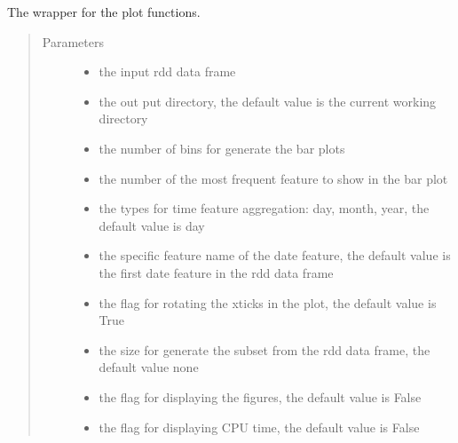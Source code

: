 \documentclass[letterpaper,12pt,english]{sphinxmanual}
\begin{document}
\begin{fulllineitems}
The wrapper for the plot functions.
\begin{quote}\begin{description}
\item[{Parameters}] \leavevmode\begin{itemize}
\item {} 
 \textendash{} the input rdd data frame

\item {} 
 \textendash{} the out put directory, the default value is the current working directory

\item {} 
 \textendash{} the number of bins for generate the bar plots

\item {} 
 \textendash{} the number of the most frequent feature to show in the bar plot

\item {} 
 \textendash{} the types for time feature aggregation: day, month, year, the default value is day

\item {} 
 \textendash{} the specific feature name of the date feature, the default value
is the first date feature in the rdd data frame

\item {} 
 \textendash{} the flag for rotating the xticks in the plot, the default value is True

\item {} 
 \textendash{} the size for generate the subset from the rdd data frame, the
default value none

\item {} 
 \textendash{} the flag for displaying the figures, the default value is False

\item {} 
 \textendash{} the flag for displaying CPU time, the default value is False

\end{itemize}

\end{description}\end{quote}

\end{fulllineitems}
\end{document}
